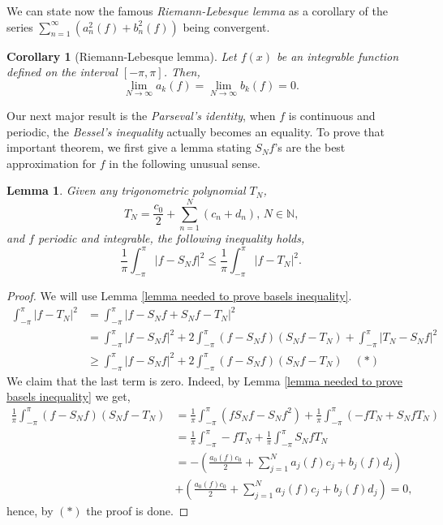 \documentclass[12pt]{amsart}
\newtheorem{corollary}[theorem]{Corollary}
\newtheorem{lemma}[theorem]{Lemma}
\theoremstyle{definition}
\newcommand{\NN}{{\mathbb N}} %
\begin{document}
We can state now the famous \emph{Riemann-Lebesque lemma} as a corollary of the series $\sum_{n=1}^{\infty} \left(a_n^2(f) + b_n^2(f)\right)$ being convergent.


\begin{corollary}[Riemann-Lebesque lemma] Let $f(x)$ be an integrable function defined on the interval $[-\pi, \pi]$. Then,
    \[
    \lim_{N \to \infty}a_k(f) = \lim_{N \to \infty}b_k(f) = 0.
    \]
\end{corollary}


Our next major result is the \textit{Parseval's identity}, when $f$ is continuous and periodic, the \textit{Bessel's inequality} actually becomes an equality. To prove that important theorem, we first give a lemma stating $S_Nf$'s are the best approximation for $f$ in the following unusual sense.


\begin{lemma}
    Given any trigonometric polynomial $T_N$,
    \[
    T_N = \frac{c_0}{2} + \sum_{n=1}^{N} (c_n + d_n) \text{, $N \in \NN$,}
    \]
    and $f$ periodic and integrable, the following inequality holds,
    \[
    \frac{1}{\pi} \int_{-\pi}^{\pi}\left| f - S_Nf\right|^2 \leq \frac{1}{\pi} \int_{-\pi}^{\pi}\left| f - T_N\right|^2.
    \]
\end{lemma}


\begin{proof}
    We will use Lemma \ref{lemma needed to prove basels inequality}.
    \[
    \begin{aligned}
        \int_{-\pi}^{\pi}\left| f - T_N\right|^2
        &= \int_{-\pi}^{\pi}\left| f - S_Nf + S_Nf - T_N\right|^2\\
        &=  \int_{-\pi}^{\pi} \left| f - S_Nf\right|^2
        + 2 \int_{-\pi}^{\pi}  (f - S_Nf)(S_Nf - T_N)
        + \int_{-\pi}^{\pi} \left| T_N - S_Nf\right|^2 \\
        &\geq \int_{-\pi}^{\pi} \left| f - S_Nf\right|^2
        + 2 \int_{-\pi}^{\pi}  (f - S_Nf)(S_Nf - T_N)  \quad(\ast)
    \end{aligned}
    \]
    We claim that the last term is zero. Indeed, by Lemma \ref{lemma needed to prove basels inequality} we get,
    \[
    \begin{aligned}
        \frac{1}{\pi}\int_{-\pi}^{\pi}  (f - S_Nf)(S_Nf - T_N)
        &= \frac{1}{\pi} \int_{-\pi}^{\pi}  (fS_Nf - S_Nf^2) + \frac{1}{\pi} \int_{-\pi}^{\pi} (-fT_N + S_NfT_N) \quad \\
        &= \frac{1}{\pi} \int_{-\pi}^{\pi} -fT_N + \frac{1}{\pi} \int_{-\pi}^{\pi}  S_NfT_N\\
        &= -\left( \frac{a_0(f)c_0}{2} + \sum_{j=1}^{N}a_j(f)c_j + b_j(f)d_j\right) \\
        &+ \left( \frac{a_0(f)c_0}{2} + \sum_{j=1}^{N}a_j(f)c_j + b_j(f)d_j\right) = 0,
    \end{aligned}
    \]
    hence, by $(\ast)$ the proof is done.
\end{proof}
\end{document}
